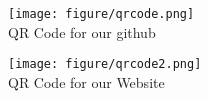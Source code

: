 \documentclass[article,36pt,extrafontsizes,oneside,openany,oldfontcommands]{memoir}
\begin{document}
\begin{adjmulticols*}{3}{0.5in}{0.5in}
\begin{figure}
	\centering
	\begin{minipage}{0.45\linewidth}
		\centering
		\texttt{[image: figure/qrcode.png]}
		\\QR Code for our github
	\end{minipage}\hfill
	\begin{minipage}{0.45\linewidth}
		\centering
		\texttt{[image: figure/qrcode2.png]}
		\\QR Code for our Website
	\end{minipage}\hfill
\end{figure}


\end{adjmulticols*}
\end{document}
